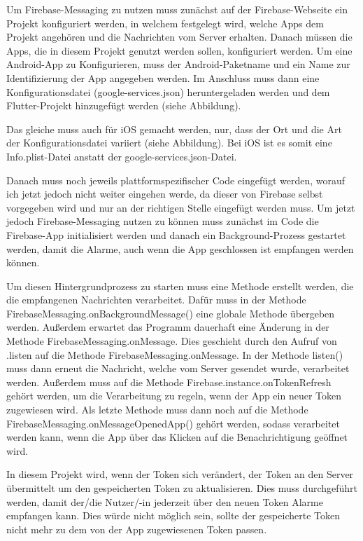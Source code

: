 Um Firebase-Messaging zu nutzen muss zunächst auf der Firebase-Webseite ein Projekt 
konfiguriert werden, in welchem festgelegt wird, welche Apps dem Projekt angehören 
und die Nachrichten vom Server erhalten. Danach müssen die Apps, die in diesem 
Projekt genutzt werden sollen, konfiguriert werden. Um eine Android-App zu 
Konfigurieren, muss der Android-Paketname und ein Name zur Identifizierung 
der App angegeben werden. Im Anschluss muss dann eine Konfigurationsdatei 
(google-services.json) heruntergeladen werden und dem Flutter-Projekt hinzugefügt 
werden (siehe Abbildung).

Das gleiche muss auch für iOS gemacht werden, nur, dass der Ort und die Art der 
Konfigurationsdatei variiert (siehe Abbildung). Bei iOS ist es somit eine 
Info.plist-Datei anstatt der google-services.json-Datei.

Danach muss noch jeweils plattformspezifischer Code eingefügt werden, worauf 
ich jetzt jedoch nicht weiter eingehen werde, da dieser von Firebase selbst 
vorgegeben wird und nur an der richtigen Stelle eingefügt werden muss.
Um jetzt jedoch Firebase-Messaging nutzen zu können muss zunächst im Code die 
Firebase-App initialisiert werden und danach ein Background-Prozess gestartet 
werden, damit die Alarme, auch wenn die App geschlossen ist empfangen werden können.

Um diesen Hintergrundprozess zu starten muss eine Methode erstellt werden, die die 
empfangenen Nachrichten verarbeitet. Dafür muss in der Methode 
FirebaseMessaging.onBackgroundMessage() eine globale Methode übergeben werden. 
Außerdem erwartet das Programm dauerhaft eine Änderung in der Methode FirebaseMessaging.onMessage.
Dies geschieht durch den Aufruf von \glqq .listen\grqq{} auf die Methode 
FirebaseMessaging.onMessage. In der Methode listen() muss dann erneut die Nachricht, 
welche vom Server gesendet wurde, verarbeitet werden. Außerdem muss auf die Methode 
Firebase.instance.onTokenRefresh gehört werden, um die Verarbeitung zu regeln, wenn
der App ein neuer Token zugewiesen wird. Als letzte Methode muss dann noch auf die 
Methode FirebaseMessaging.onMessageOpenedApp() gehört werden, sodass verarbeitet 
werden kann, wenn die App über das Klicken auf die Benachrichtigung geöffnet wird.

In diesem Projekt wird, wenn der Token sich verändert, der Token an den Server übermittelt um
den gespeicherten Token zu aktualisieren. Dies muss durchgeführt werden, damit der/die Nutzer/-in
jederzeit über den neuen Token Alarme empfangen kann. Dies würde nicht möglich sein, sollte der 
gespeicherte Token nicht mehr zu dem von der App zugewiesenen Token passen.

